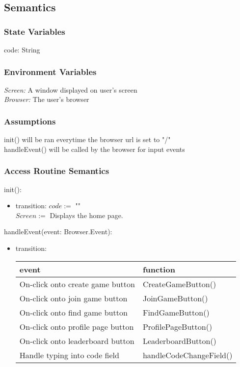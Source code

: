 \documentclass[12pt, titlepage]{article}
\begin{document}
\subsection{Semantics}
\subsubsection{State Variables}

code: String

\subsubsection{Environment Variables}
\textit{Screen: } A window displayed on user's screen\\
\textit{Browser: } The user's browser

\subsubsection{Assumptions}

init() will be ran everytime the browser url is set to "/"\\
handleEvent() will be called by the browser for input events

\subsubsection{Access Routine Semantics}
\noindent init():
\begin{itemize}
\item transition:
$code :=$ ""\\
$Screen :=$ Displays the home page. 
\end{itemize}


\noindent handleEvent(event: Browser.Event):
\begin{itemize}
\item transition: \begin{tabular}{p{5cm} p{4cm}}
\hline
\textbf{event} & \textbf{function} \\
\hline
On-click onto create game button & CreateGameButton() \\
On-click onto join game button & JoinGameButton() \\
On-click onto find game button & FindGameButton() \\
On-click onto profile page button & ProfilePageButton() \\
On-click onto leaderboard button & LeaderboardButton() \\
Handle typing into code field  & handleCodeChangeField() \\
\hline
\end{tabular}
\end{itemize}
\end{document}
